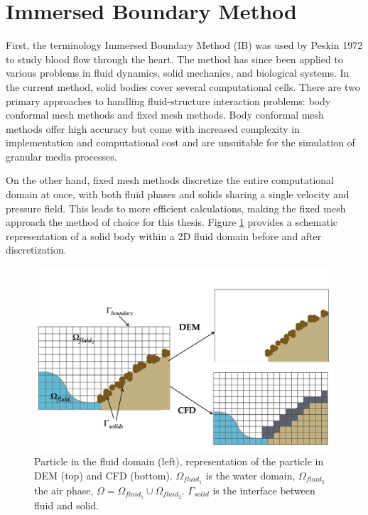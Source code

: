 \section{Immersed Boundary Method}
First, the terminology Immersed Boundary Method (IB) was used by Peskin 1972 \cite{peskin1972flow} to study blood flow through the heart. The method has since been applied to various problems in fluid dynamics, solid mechanics, and biological systems. In the current method, solid bodies cover several computational cells. There are two primary approaches to handling fluid-structure interaction problems: body conformal mesh methods and fixed mesh methods. Body conformal mesh methods offer high accuracy but come with increased complexity in implementation and computational cost and are unsuitable for the simulation of granular media processes.

On the other hand, fixed mesh methods discretize the entire computational domain at once, with both fluid phases and solids sharing a single velocity and pressure field. This leads to more efficient calculations, making the fixed mesh approach the method of choice for this thesis. Figure \ref{fig:CFDDEM} provides a schematic representation of a solid body within a 2D fluid domain before and after discretization. 
\begin{figure}[H]
    \centering
    \includegraphics[width=14cm]{Images/CFD_DEM_scheme.png}
    \caption{Particle in the fluid domain (left), representation of the particle in DEM (top) and CFD (bottom).  $\Omega_{fluid_1}$ is the water domain, $\Omega_{fluid_2}$ the air phase, $\Omega = \Omega_{fluid_1} \cup \Omega_{fluid_2} $. $\Gamma_{solid}$ is the interface between fluid and solid. 
}
    \label{fig:CFDDEM}
\end{figure}


